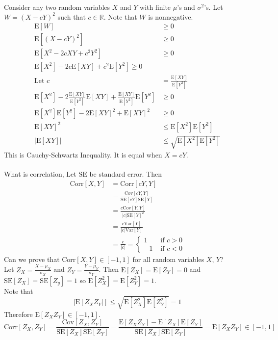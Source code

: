 \documentclass[12pt]{article}
\newcommand{\expected}[1]{\mathrm{E}[#1]}
\newcommand{\variance}[1]{\mathrm{Var}[#1]}
\newcommand{\covariance}[1]{\mathrm{Cov}[#1]}
\newcommand{\corr}[1]{\mathrm{Corr}[#1]}
\newcommand{\se}[1]{\mathrm{SE}[#1]}
\begin{document}
Consider any two random variables $X$ and $Y$ with finite $\mu$'s and $\sigma^2$'s. Let $W = (X - cY)^2$ such that $c \in \mathbb{R}$. Note that $W$ is nonnegative. $$ \begin{aligned} \expected{W} &\geq 0 \\ \expected{(X - cY)^2} &\geq 0 \\ \expected{X^2 - 2cXY + c^2Y^2} &\geq 0 \\ \expected{X^2} - 2c\expected{XY} + c^2\expected{Y^2} \geq 0 \\ \text{Let } c &= \frac{\expected{XY}}{\expected{Y^2}} \\ \expected{X^2} - 2 \frac{\expected{XY}}{\expected{Y^2}} \expected{XY} + \frac{\expected{XY}}{\expected{Y^2}}\expected{Y^2} &\geq 0 \\ \expected{X^2}\expected{Y^2} - 2\expected{XY}^2 + \expected{XY}^2 &\geq 0 \\ \expected{XY}^2 &\leq \expected{X^2}\expected{Y^2} \\ |\expected{XY}| &\leq \sqrt{\expected{X^2}\expected{Y^2}} \end{aligned} $$ 
This is Cauchy-Schwartz Inequality. It is equal when $X = cY$. \\~\\
What is correlation, Let $\mathrm{SE}$ be standard error. Then $$ \begin{aligned} 
\corr{X,Y} &= \corr{cY,Y} \\ &= \frac{\covariance{cY,Y}}{\se{cY}\se{Y}} \\ &= \frac{c\covariance{Y,Y}}{|c|\se{Y}^2} \\ &= \frac{c\variance{Y}}{|c|\variance{Y}} \\ &= \frac{c}{|c|} = \begin{cases} 1 &\text{ if } c > 0 \\ -1 &\text{ if } c < 0 \end{cases} \end{aligned} $$ 
Can we prove that $\corr{X,Y} \in [-1,1]$ for all random variables $X$, $Y$? \\
Let $Z_X = \frac{X - \mu_X}{\sigma_X}$ and $Z_Y = \frac{Y - \mu_Y}{\sigma_Y}$. Then $\expected{Z_X} = \expected{Z_Y} = 0$ and $\se{Z_X} = \se{Z_y} = 1$ so $\expected{Z_X^2} = \expected{Z_Y^2} = 1$. \\ Note that $$ |\expected{Z_XZ_Y|} \leq \sqrt{\expected{Z_X^2}\expected{Z_Y^2}} = 1$$ Therefore $\expected{Z_XZ_Y} \in [-1,1]$. 
$$ \corr{Z_X,Z_Y} = \frac{\covariance{Z_X,Z_Y}}{\se{Z_X}\se{Z_Y}} = \frac{\expected{Z_XZ_Y} - \expected{Z_X}\expected{Z_Y}}{\se{Z_X}\se{Z_Y}} = \expected{Z_XZ_Y} \in [-1,1] $$ 
\end{document}
